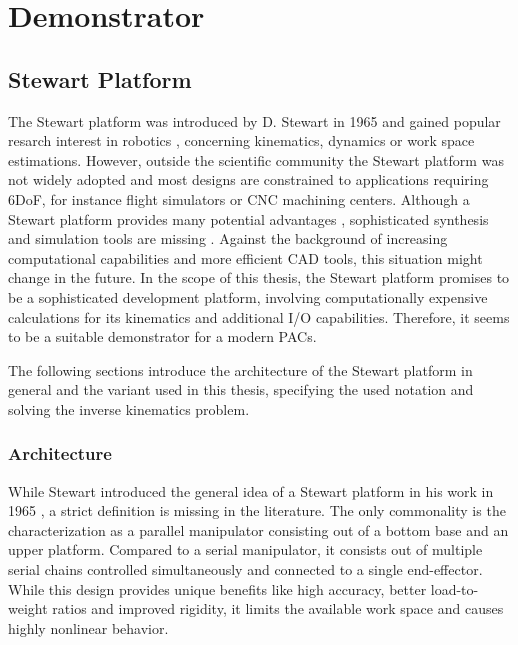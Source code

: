\chapter{Demonstrator}
\label{sec:demo}

\section{Stewart Platform}
The Stewart platform was introduced by D. Stewart in 1965 \citep{Ste65} and
gained popular resarch interest in robotics \citep{Szu13}, concerning
kinematics, dynamics or work space estimations. However, outside the
scientific community the Stewart platform was not widely adopted and most
designs are constrained to applications requiring \ac{6DoF}, for instance
flight simulators or \ac{CNC} machining centers. Although a Stewart platform
provides many potential advantages , sophisticated synthesis and simulation
tools are missing \citep{Ji96}. Against the background of increasing
computational capabilities and more efficient \ac{CAD} tools, this situation
might change in the future. In the scope of this thesis, the Stewart platform
promises to be a sophisticated development platform, involving computationally
expensive calculations for its kinematics and additional I/O capabilities.
Therefore, it seems to be a suitable demonstrator for a modern \acp{PAC}.

The following sections introduce the architecture of the Stewart platform in
general and the variant used in this thesis, specifying the used notation and
solving the inverse kinematics problem.

\subsection{Architecture}
While Stewart introduced the general idea of a Stewart platform in his work in
1965 \citep{Ste65}, a strict definition is missing in the literature. The only
commonality is the characterization as a parallel manipulator \citep{Szu13}
consisting out of a bottom base and an upper platform. Compared to a serial
manipulator, it consists out of multiple serial chains controlled
simultaneously and connected to a single end-effector. While this design
provides unique benefits like high accuracy, better load-to-weight ratios and
improved rigidity, it limits the available work space and causes highly
nonlinear behavior.

